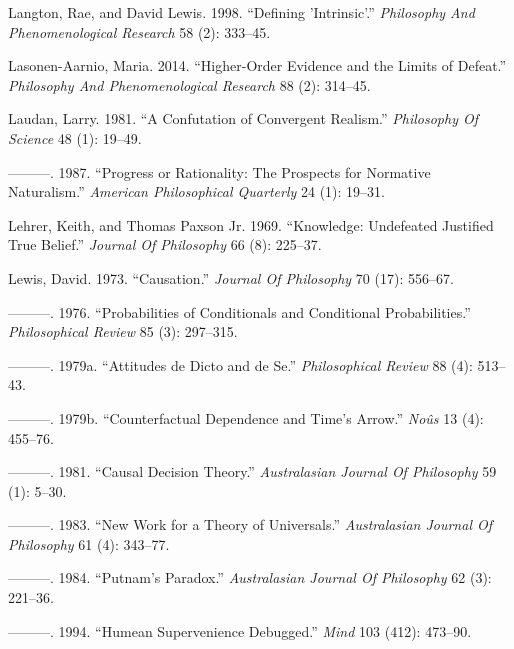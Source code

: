 \documentclass[
  10pt,
  letterpaper,
  DIV=11,
  numbers=noendperiod,
  twoside]{scrartcl}
\newlength{\cslhangindent}
\newenvironment{CSLReferences}[2] %
 {\begin{list}{}{%
  \setlength{\itemindent}{0pt}
  \setlength{\leftmargin}{0pt}
  \setlength{\parsep}{0pt}
  \ifodd #1
   \setlength{\leftmargin}{\cslhangindent}
   \setlength{\itemindent}{-1\cslhangindent}
  \fi
  \setlength{\itemsep}{#2\baselineskip}}}
 {\end{list}}
\begin{document}
\begin{CSLReferences}{1}{0}
Langton, Rae, and David Lewis. 1998. {``Defining 'Intrinsic'.''}
\emph{Philosophy And Phenomenological Research} 58 (2): 333--45.

Lasonen-Aarnio, Maria. 2014. {``Higher-Order Evidence and the Limits of
Defeat.''} \emph{Philosophy And Phenomenological Research} 88 (2):
314--45.

Laudan, Larry. 1981. {``A Confutation of Convergent Realism.''}
\emph{Philosophy Of Science} 48 (1): 19--49.

---------. 1987. {``Progress or Rationality: The Prospects for Normative
Naturalism.''} \emph{American Philosophical Quarterly} 24 (1): 19--31.

Lehrer, Keith, and Thomas Paxson Jr. 1969. {``Knowledge: Undefeated
Justified True Belief.''} \emph{Journal Of Philosophy} 66 (8): 225--37.

Lewis, David. 1973. {``Causation.''} \emph{Journal Of Philosophy} 70
(17): 556--67.

---------. 1976. {``Probabilities of Conditionals and Conditional
Probabilities.''} \emph{Philosophical Review} 85 (3): 297--315.

---------. 1979a. {``Attitudes de Dicto and de Se.''}
\emph{Philosophical Review} 88 (4): 513--43.

---------. 1979b. {``Counterfactual Dependence and Time's Arrow.''}
\emph{Noûs} 13 (4): 455--76.

---------. 1981. {``Causal Decision Theory.''} \emph{Australasian
Journal Of Philosophy} 59 (1): 5--30.

---------. 1983. {``New Work for a Theory of Universals.''}
\emph{Australasian Journal Of Philosophy} 61 (4): 343--77.

---------. 1984. {``Putnam's Paradox.''} \emph{Australasian Journal Of
Philosophy} 62 (3): 221--36.

---------. 1994. {``Humean Supervenience Debugged.''} \emph{Mind} 103
(412): 473--90.


\end{CSLReferences}
\end{document}
